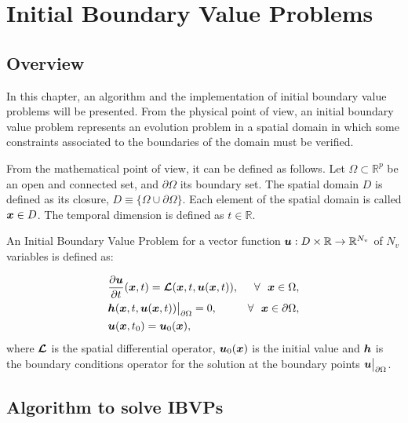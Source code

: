      
\chapter{Initial Boundary Value Problems}\label{Dev:IBVP}

\section{Overview}
    
In this chapter, an algorithm and the implementation of initial boundary value problems will be presented. From the physical point of view, an initial boundary value problem represents an evolution problem in a spatial domain in which some constraints associated to the boundaries of the domain must be verified. 


From the mathematical point of view, it can be defined as follows.        
Let $\Omega \subset \mathbb{ R}^p$ be  an open and connected set, and $\partial \Omega$ its boundary set. The spatial domain $D$ is defined as its closure, $D \equiv \{\Omega \cup \partial \Omega\}$. Each element of the spatial domain is called  $\boldsymbol{x} \in D $. The temporal dimension is defined as $t \in \mathbb{R} $.
       
An Initial Boundary Value Problem for a vector function $\boldsymbol{u}: D \times \mathbb{R}\rightarrow \mathbb{R}^{N_v}$ of $N_v$ variables is defined as:
       
       \begin{align*}
         &\frac{\partial \vect{u} }{\partial t}(\vect{x},t) =\vect{\mathcal{L}} (\vect{x},t,\vect{u}(\vect{x},t)) , & \forall \ \ \vect{x} \in  \Omega, \\
         &\vect{h} (\vect{x},t,\vect{u}(\vect{x},t))\big\rvert_{\partial \Omega}=0 ,  & \forall \ \ \vect{x} \in \partial \Omega,\\
         & \vect{u}(\vect{x},t_0)=\vect{u}_0(\vect{x}), 
       \end{align*}
where $\boldsymbol{\mathcal{L}}$ is the spatial differential operator, $\boldsymbol{u}_0(\boldsymbol{x})$ is the initial value and $\boldsymbol{h}$ is the boundary conditions operator for the solution at the boundary points $\boldsymbol{u} \big\rvert_{\partial \Omega}$.

 
       
\newpage       
\section{Algorithm to solve IBVPs}
   
